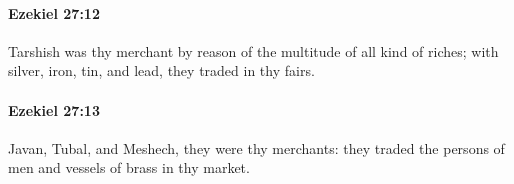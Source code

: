 		\paragraph{Ezekiel 27:12} %
			\label{EZEKIEL-27-12}

			Tarshish was thy merchant by reason of the multitude of all kind of riches; with silver, iron, tin, and lead, they traded in thy fairs.


		\paragraph{Ezekiel 27:13} %
			\label{EZEKIEL-27-13}

			Javan, Tubal, and Meshech, they were thy merchants: they traded the persons of men and vessels of brass in thy market.



